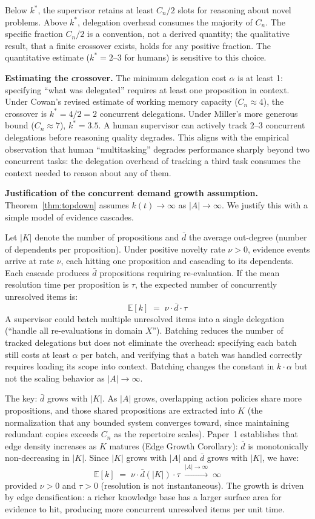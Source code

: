\documentclass[11pt]{article}
\theoremstyle{definition}
\begin{document}
Below $k^*$, the supervisor retains at least $C_n/2$ slots for
reasoning about novel problems. Above $k^*$, delegation overhead
consumes the majority of $C_n$. The specific fraction $C_n/2$ is a
convention, not a derived quantity; the qualitative result, that a finite
crossover exists, holds for any positive fraction. The quantitative
estimate ($k^* = 2$--$3$ for humans) is sensitive to this choice.

\textbf{Estimating the crossover.} The minimum delegation cost $\alpha$
is at least 1: specifying ``what was delegated'' requires at least one
proposition in context. Under Cowan's \cite{Cowan2001} revised estimate
of working memory capacity ($C_n \approx 4$), the crossover is
$k^* = 4/2 = 2$ concurrent delegations. Under Miller's more generous
bound ($C_n \approx 7$), $k^* = 3.5$. A human supervisor can
actively track 2--3 concurrent delegations before reasoning quality
degrades. This aligns with the empirical observation that human
``multitasking'' degrades performance sharply beyond two concurrent
tasks: the delegation overhead of tracking a third task consumes the
context needed to reason about any of them.

\textbf{Justification of the concurrent demand growth assumption.}
Theorem~\ref{thm:topdown} assumes $k(t) \to \infty$ as
$|A| \to \infty$. We justify this with a simple model of evidence
cascades.

Let $|K|$ denote the number of propositions and $\bar{d}$ the average
out-degree (number of dependents per proposition). Under positive
novelty rate $\nu > 0$, evidence events arrive at rate $\nu$, each
hitting one proposition and cascading to its dependents. Each cascade
produces $\bar{d}$ propositions requiring re-evaluation. If the mean
resolution time per proposition is $\tau$, the expected number of
concurrently unresolved items is:
\[
\mathbb{E}[k] \;=\; \nu \cdot \bar{d} \cdot \tau
\]
A supervisor could batch multiple unresolved items into a single
delegation (``handle all re-evaluations in domain $X$''). Batching
reduces the number of tracked delegations but does not eliminate the
overhead: specifying each batch still costs at least $\alpha$ per
batch, and verifying that a batch was handled correctly requires
loading its scope into context. Batching changes the constant in
$k \cdot \alpha$ but not the scaling behavior as $|A| \to \infty$.

The key: $\bar{d}$ grows with $|K|$. As $|A|$ grows, overlapping
action policies share more propositions, and those shared propositions
are extracted into $K$ (the normalization that any bounded system
converges toward, since maintaining redundant copies exceeds $C_n$ as
the repertoire scales). Paper~1 \cite{McCarthy2026a} establishes that
edge density increases as $K$ matures (Edge Growth Corollary): $\bar{d}$ is
monotonically non-decreasing in $|K|$. Since $|K|$ grows with $|A|$
and $\bar{d}$ grows with $|K|$, we have:
\[
\mathbb{E}[k] \;=\; \nu \cdot \bar{d}(|K|) \cdot \tau
\;\xrightarrow{|A| \to \infty}\; \infty
\]
provided $\nu > 0$ and $\tau > 0$ (resolution is not instantaneous).
The growth is driven by edge densification: a richer knowledge base has
a larger surface area for evidence to hit, producing more concurrent
unresolved items per unit time.
\end{document}
